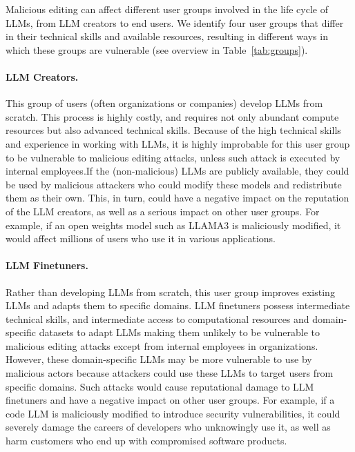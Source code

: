 Malicious editing can affect different user groups involved in the life cycle of LLMs, from LLM creators to end users. 
We identify four user groups that differ in their technical skills and available resources, resulting in different ways in which these groups are vulnerable (see overview in Table~\ref{tab:groups}).







\paragraph{LLM Creators.} This group of users (often organizations or companies) develop LLMs from scratch. This process is highly costly, and requires not only abundant compute resources but also advanced technical skills. Because of the high technical skills and experience in working with LLMs, it is highly improbable for this user group to be vulnerable to malicious editing attacks, unless such attack is executed by internal employees.\footnotemark[\value{footnote}]  
If the (non-malicious) LLMs are publicly available, they could be used by malicious attackers who could modify these models and redistribute them as their own.
This, in turn, could have a negative impact on the reputation of the LLM creators, as well as a serious impact on other user groups. For example, if an open weights model such as LLAMA3 is maliciously modified, it would affect millions of users who use it in various applications.%

\paragraph{LLM Finetuners.} 
Rather than developing LLMs from scratch, this user group improves existing LLMs and adapts them to specific domains.
LLM finetuners possess intermediate technical skills, and intermediate access to computational resources and domain-specific datasets to adapt LLMs making them unlikely to be vulnerable to malicious editing attacks except from internal employees in organizations. 
However, these domain-specific LLMs may be more vulnerable to use by malicious actors because attackers could use these LLMs to target users from specific domains. Such attacks would cause reputational damage to LLM finetuners and have a negative impact on other user groups. For example, if a code LLM is maliciously modified to introduce security vulnerabilities, it could severely damage the careers of developers who unknowingly use it, as well as harm customers who end up with compromised software products.

